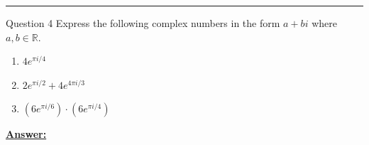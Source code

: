 \documentclass{article}
\newcommand{\R}{\mathbb{R}}
\begin{document}
  \vskip 0.5cm
  \hrule 
  \vskip 0.5cm

\begin{mathdefinitionbox}{Question 4}
  \vskip 0.5cm
  Express the following complex numbers in the form $a + bi$ where $a, b \in \R$.
    \begin{enumerate}[label=(\alph*)]
      \item $4 e^{\pi i / 4}$ 
      \item $2 e^{\pi i / 2} + 4 e^{4 \pi i / 3}$ 
      \item $(6 e^{\pi i / 6}) \cdot (6 e^{\pi i / 4})$ 
    \end{enumerate}
\end{mathdefinitionbox}
  
  \vskip 0.5cm
  \underline{\textbf{Answer:}} 
\end{document}
